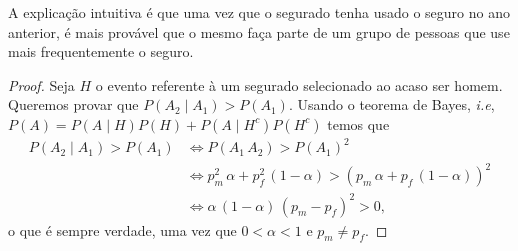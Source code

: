 \begin{questions}
\begin{solution}
	A explicação intuitiva é que uma vez que o segurado tenha usado o seguro no ano anterior, é mais provável que o mesmo faça parte de um grupo de pessoas que use mais frequentemente o seguro.
    \begin{proof}
    	Seja $H$ o evento referente à um segurado selecionado ao acaso ser homem. Queremos provar que $P(A_2\mid A_1) > P(A_1)$. Usando o teorema de Bayes, \textit{i.e}, $P(A) = P(A\mid H)P(H)+P(A\mid H^c)P(H^c)$ temos que
        \begin{align*}
        	P(A_2\mid A_1) > P(A_1) 
            	&\Leftrightarrow P(A_1\,A_2) > P(A_1)^2 \\
                &\Leftrightarrow p_m^2\,\alpha+p_f^2\,(1-\alpha) > 
                	(p_m\,\alpha+p_f\,(1-\alpha))^2\\
				&\Leftrightarrow \alpha\,(1-\alpha)\,(p_m-p_f)^2 > 0,
        \end{align*}
        o que é sempre verdade, uma vez que $0<\alpha<1$ e $p_m\neq p_f$.
    \end{proof}
\end{solution}


\end{questions}
